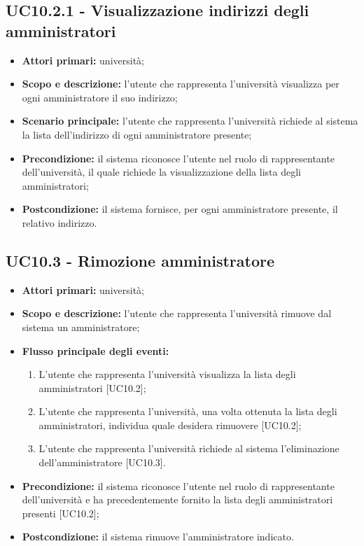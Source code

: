 \documentclass[AnalisiDeiRequisiti.tex]{subfiles}
\begin{document}
\subsection{UC10.2.1 - Visualizzazione indirizzi degli amministratori}
\begin{itemize}
	\item \textbf{Attori primari:} università;
	\item \textbf{Scopo e descrizione:} l'utente che rappresenta l'università visualizza per ogni amministratore il suo indirizzo;
	\item \textbf{Scenario principale:} l'utente che rappresenta l'università richiede al sistema la lista dell'indirizzo di ogni amministratore presente;
	\item \textbf{Precondizione:} il sistema riconosce l'utente nel ruolo di rappresentante dell'università, il quale richiede la visualizzazione della lista degli amministratori;
	\item \textbf{Postcondizione:} il sistema fornisce, per ogni amministratore presente, il relativo indirizzo.
\end{itemize}
\subsection{UC10.3 - Rimozione amministratore}
\begin{itemize}
	\item \textbf{Attori primari:} università;
	\item \textbf{Scopo e descrizione:} l'utente che rappresenta l'università rimuove dal sistema un amministratore;
	\item \textbf{Flusso principale degli eventi:}
	\begin{enumerate}
		\item L'utente che rappresenta l'università  visualizza la lista degli amministratori [UC10.2];
		\item L'utente che rappresenta l'università, una volta ottenuta la lista degli amministratori, individua quale desidera rimuovere [UC10.2];
		\item L'utente che rappresenta l'università richiede al sistema l'eliminazione dell'amministratore [UC10.3].
	\end{enumerate}
	\item \textbf{Precondizione:} il sistema riconosce l'utente nel ruolo di rappresentante dell'università e ha precedentemente fornito la lista degli amministratori presenti [UC10.2]; 
	\item \textbf{Postcondizione:} il sistema rimuove l'amministratore indicato.
\end{itemize}
\end{document}
